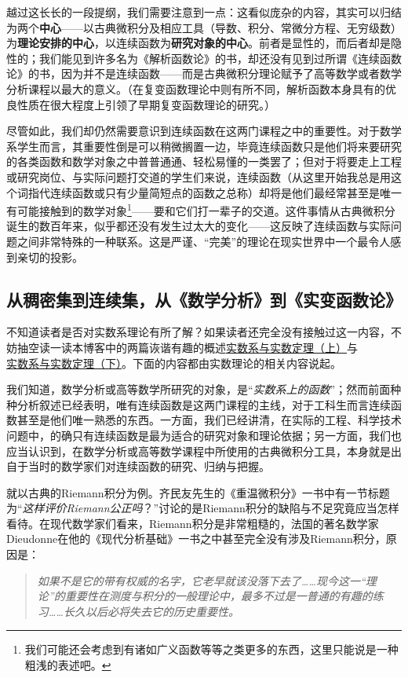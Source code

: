 \documentclass[12pt,a4paper]{article}
\begin{document}
{{\begin{itemize}
			\end{itemize}
			
			越过这长长的一段提纲，我们需要注意到一点：这看似庞杂的内容，其实可以归结为两个{\bfseries 中心}——以古典微积分及相应工具（导数、积分、常微分方程、无穷级数）为{\bfseries 理论安排的中心}，以连续函数为{\bfseries 研究对象的中心}。前者是显性的，而后者却是隐性的；我们能见到许多名为《解析函数论》的书，却还没有见到过所谓《连续函数论》的书，因为并不是连续函数——而是古典微积分理论赋予了高等数学或者数学分析课程以最大的意义。（在复变函数理论中则有所不同，解析函数本身具有的优良性质在很大程度上引领了早期复变函数理论的研究。）
			
			尽管如此，我们却仍然需要意识到连续函数在这两门课程之中的重要性。对于数学系学生而言，其重要性倒是可以稍微搁置一边，毕竟连续函数只是他们将来要研究的各类函数和数学对象之中普普通通、轻松易懂的一类罢了；但对于将要走上工程或研究岗位、与实际问题打交道的学生们来说，连续函数（从这里开始我总是用这个词指代连续函数或只有少量简短点的函数之总称）却将是他们最经常甚至是唯一有可能接触到的数学对象\footnote{我们可能还会考虑到有诸如广义函数等等之类更多的东西，这里只能说是一种粗浅的表述吧。}——要和它们打一辈子的交道。这件事情从古典微积分诞生的数百年来，似乎都还没有发生过太大的变化——这反映了连续函数与实际问题之间非常特殊的一种联系。这是严谨、“完美”的理论在现实世界中一个最令人感到亲切的投影。
		}
		\subsection{从稠密集到连续集，从《数学分析》到《实变函数论》}{
			不知道读者是否对实数系理论有所了解？如果读者还完全没有接触过这一内容，不妨抽空读一读本博客中的两篇诙谐有趣的概述\href{https://www.cnblogs.com/xjtu-blacksmith/p/7616948.html}{\underline{实数系与实数定理（上）}}与\\\href{http://www.cnblogs.com/xjtu-blacksmith/p/7625717.html}{\underline{实数系与实数定理（下）}}。下面的内容都由实数理论的相关内容说起。
			
			我们知道，数学分析或高等数学所研究的对象，是“{\slshape 实数系上的函数}”；然而前面种种分析叙述已经表明，唯有连续函数是这两门课程的主线，对于工科生而言连续函数甚至是他们唯一熟悉的东西。一方面，我们已经讲清，在实际的工程、科学技术问题中，的确只有连续函数是最为适合的研究对象和理论依据；另一方面，我们也应当认识到，在数学分析或高等数学课程中所使用的古典微积分工具，本身就是出自于当时的数学家们对连续函数的研究、归纳与把握。
			
			就以古典的Riemann积分为例。齐民友先生的《重温微积分》一书中有一节标题为“{\slshape 这样评价Riemann公正吗}？”讨论的是Riemann积分的缺陷与不足究竟应当怎样看待。在现代数学家们看来，Riemann积分是非常粗糙的，法国的著名数学家Dieudonne在他的《现代分析基础》一书之中甚至完全没有涉及Riemann积分，原因是：
			\begin{quote}\itshape
				如果不是它的带有权威的名字，它老早就该没落下去了……现今这一“理论”的重要性在测度与积分的一般理论中，最多不过是一普通的有趣的练习……长久以后必将失去它的历史重要性。
			\end{quote}
			
}}
\end{document}
